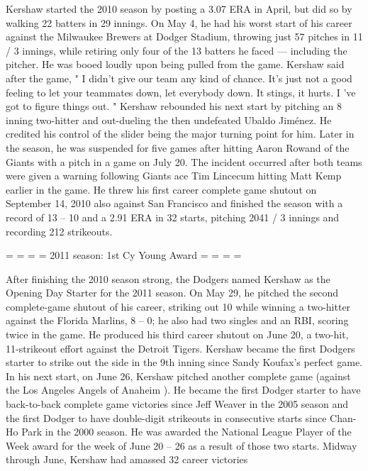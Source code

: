 Kershaw started the 2010 season by posting a 3.07 ERA in April, but did so by walking 22 batters in 29 innings. On May 4, he had his worst start of his career against the Milwaukee Brewers at Dodger Stadium, throwing just 57 pitches in 11 / 3 innings, while retiring only four of the 13 batters he faced — including the pitcher. He was booed loudly upon being pulled from the game. Kershaw said after the game, " I didn't give our team any kind of chance. It's just not a good feeling to let your teammates down, let everybody down. It stings, it hurts. I 've got to figure things out. " 
Kershaw rebounded his next start by pitching an 8 inning two-hitter and out-dueling the then undefeated Ubaldo Jim\'{e}nez. He credited his control of the slider being the major turning point for him. Later in the season, he was suspended for five games after hitting Aaron Rowand of the Giants with a pitch in a game on July 20. The incident occurred after both teams were given a warning following Giants ace Tim Lincecum hitting Matt Kemp earlier in the game. He threw his first career complete game shutout on September 14, 2010 also against San Francisco and finished the season with a record of 13 – 10 and a 2.91 ERA in 32 starts, pitching 2041 / 3 innings and recording 212 strikeouts. 

= = = = 2011 season: 1st Cy Young Award = = = = 

After finishing the 2010 season strong, the Dodgers named Kershaw as the Opening Day Starter for the 2011 season. On May 29, he pitched the second complete-game shutout of his career, striking out 10 while winning a two-hitter against the Florida Marlins, 8 – 0; he also had two singles and an RBI, scoring twice in the game. He produced his third career shutout on June 20, a two-hit, 11-strikeout effort against the Detroit Tigers. Kershaw became the first Dodgers starter to strike out the side in the 9th inning since Sandy Koufax's perfect game. In his next start, on June 26, Kershaw pitched another complete game (against the Los Angeles Angels of Anaheim ). He became the first Dodger starter to have back-to-back complete game victories since Jeff Weaver in the 2005 season and the first Dodger to have double-digit strikeouts in consecutive starts since Chan-Ho Park in the 2000 season. He was awarded the National League Player of the Week award for the week of June 20 – 26 as a result of those two starts. Midway through June, Kershaw had amassed 32 career victories 